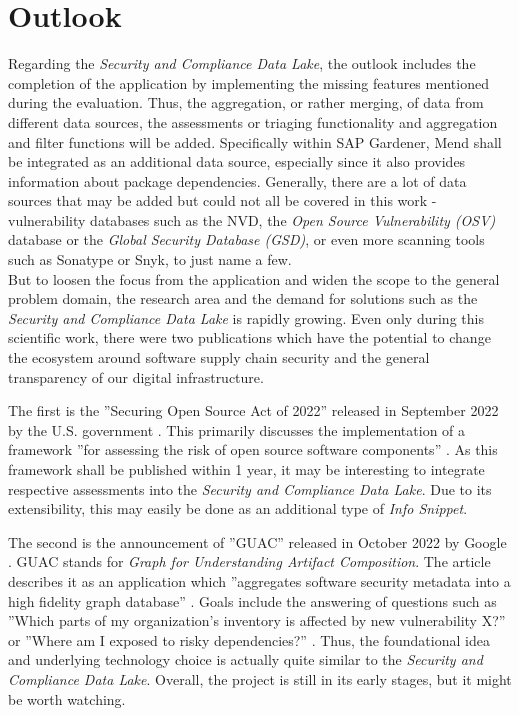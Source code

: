 \section{Outlook}
Regarding the \emph{Security and Compliance Data Lake}, the outlook includes the completion of the application by implementing the missing features mentioned during the evaluation. Thus, the aggregation, or rather merging, of data from different data sources, the assessments or triaging functionality and aggregation and filter functions will be added. Specifically within SAP Gardener, Mend shall be integrated as an additional data source, especially since it also provides information about package dependencies. Generally, there are a lot of data sources that may be added but could not all be covered in this work - vulnerability databases such as the NVD, the \emph{Open Source Vulnerability (OSV)} database or the \emph{Global Security Database (GSD)}, or even more scanning tools such as Sonatype or Snyk, to just name a few.\\
 
But to loosen the focus from the application and widen the scope to the general problem domain, the research area and the demand for solutions such as the \emph{Security and Compliance Data Lake} is rapidly growing. Even only during this scientific work, there were two publications which have the potential to change the ecosystem around software supply chain security and the general transparency of our digital infrastructure.\par
The first is the ''Securing Open Source Act of 2022'' released in September 2022 by the U.S. government \cite{SecuringOpenSourceAct}. This primarily discusses the implementation of a framework ''for assessing the risk of open source software components'' \cite{SecuringOpenSourceAct}. As this framework shall be published within 1 year, it may be interesting to integrate respective assessments into the \emph{Security and Compliance Data Lake}. Due to its extensibility, this may easily be done as an additional type of \emph{Info Snippet}.\par
The second is the announcement of ''GUAC'' released in October 2022 by Google \cite{GUAC}. GUAC stands for \emph{Graph for Understanding Artifact Composition}. The article describes it as an application which ''aggregates software security metadata into a high fidelity graph database'' \cite{GUAC}. Goals include the answering of questions such as ''Which parts of my organization's inventory is affected by new vulnerability X?'' or ''Where am I exposed to risky dependencies?'' \cite{GUAC}. Thus, the foundational idea and underlying technology choice is actually quite similar to the \emph{Security and Compliance Data Lake}. Overall, the project is still in its early stages, but it might be worth watching.\\

